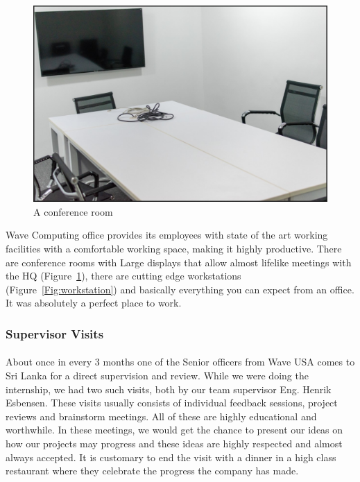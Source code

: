 \begin{figure}[H]
    \centering
    \includegraphics[trim=0cm 0cm 0cm 0cm, clip=true,scale=0.5]{figures/conf_room.jpg}
    \caption{A conference room\label{Fig:confroom}}\vspace{-4mm}
    \end{figure}
    
Wave Computing office provides its employees with state of the art working facilities with a comfortable working space, making it highly productive. There are conference rooms with Large displays that allow almost lifelike meetings with the HQ (Figure~\ref{Fig:confroom}), there are cutting edge workstations (Figure~\ref{Fig:workstation}) and basically everything you can expect from an office. It was absolutely a perfect place to work.

\subsubsection{Supervisor Visits}
\paragraph{}
About once in every 3 months one of the Senior officers from Wave USA comes to Sri Lanka for a direct supervision and review. While we were doing the internship, we had two such visits, both by our team supervisor Eng. Henrik Esbensen. These visits usually consists of individual feedback sessions, project reviews and brainstorm meetings. All of these are highly educational and worthwhile. In these meetings, we would get the chance to present our ideas on how our projects may progress and these ideas are highly respected and almost always accepted. It is customary to end the visit with a dinner in a high class restaurant where they celebrate the progress the company has made.

 